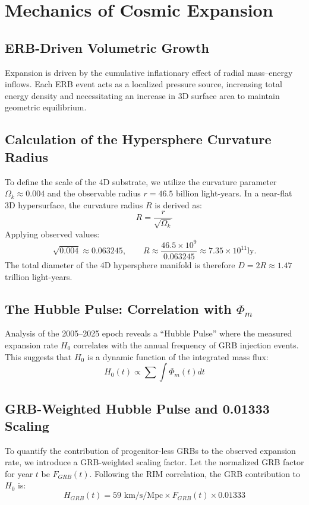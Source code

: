 \documentclass[12pt]{article}
\begin{document}
\section{Mechanics of Cosmic Expansion}
\subsection{ERB-Driven Volumetric Growth}
Expansion is driven by the cumulative inflationary effect of radial mass--energy inflows. Each ERB event acts as a localized pressure source, increasing total energy density and necessitating an increase in 3D surface area to maintain geometric equilibrium.

\subsection{Calculation of the Hypersphere Curvature Radius}
To define the scale of the 4D substrate, we utilize the curvature parameter $\Omega_k \approx 0.004$ and the observable radius $r = 46.5$ billion light-years. In a near-flat 3D hypersurface, the curvature radius $R$ is derived as:
\begin{equation}
R = \frac{r}{\sqrt{\Omega_k}}
\end{equation}
Applying observed values:
\[
\sqrt{0.004} \approx 0.063245, \qquad R \approx \frac{46.5 \times 10^9}{0.063245} \approx 7.35 \times 10^{11} \text{ly.}
\]
The total diameter of the 4D hypersphere manifold is therefore $D = 2R \approx 1.47$ trillion light-years.

\subsection{The Hubble Pulse: Correlation with $\Phi_m$}
Analysis of the 2005--2025 epoch reveals a ``Hubble Pulse'' where the measured expansion rate $H_0$ correlates with the annual frequency of GRB injection events. This suggests that $H_0$ is a dynamic function of the integrated mass flux:
\begin{equation}
H_0(t) \propto \sum \int \Phi_m(t) dt
\end{equation}

\subsection{GRB-Weighted Hubble Pulse and 0.01333 Scaling}
To quantify the contribution of progenitor-less GRBs to the observed expansion rate, we introduce a GRB-weighted scaling factor. Let the normalized GRB factor for year $t$ be $F_{GRB}(t)$. Following the RIM correlation, the GRB contribution to $H_0$ is:
\begin{equation}
H_{GRB}(t) = 59 \text{ km/s/Mpc} \times F_{GRB}(t) \times 0.01333
\end{equation}
\end{document}
